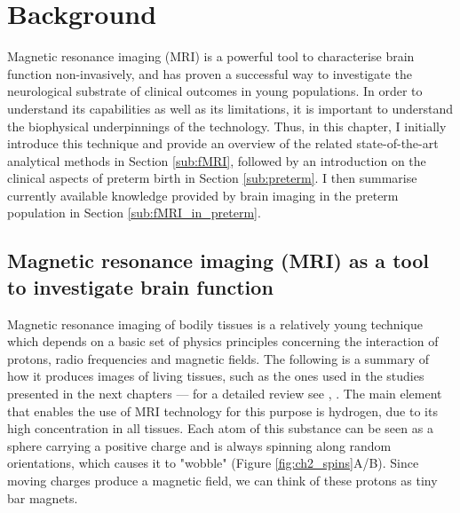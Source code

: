 \cleardoublepage
\chapter{Background} \label{chapter:ch2}




Magnetic resonance imaging (MRI) is a powerful tool to characterise brain function non-invasively, and has proven a successful way to investigate the neurological substrate of clinical outcomes in young populations. 
In order to understand its capabilities as well as its limitations, it is important to understand the biophysical underpinnings of the technology. 
Thus, in this chapter, I initially introduce this technique and provide an overview of the related state-of-the-art analytical methods in Section \ref{sub:fMRI}, followed by an introduction on the clinical aspects of preterm birth in Section \ref{sub:preterm}. 
I then summarise currently available knowledge provided by brain imaging in the preterm population in Section \ref{sub:fMRI_in_preterm}.

\section{Magnetic resonance imaging (MRI) as a tool to investigate brain function} \label{sec:MRI}
Magnetic resonance imaging \citep{Lauterbur1973} of bodily tissues is a relatively young technique \citep{Damadian1977} which depends on a basic set of physics principles concerning the interaction of protons, radio frequencies and magnetic fields. The following is a summary of how it produces images of living tissues, such as the ones used in the studies presented in the next chapters --- for a detailed review see \citeauthor{Grover2015}, \citeyear{Grover2015}. 
The main element that enables the use of MRI technology for this purpose is hydrogen, due to its high concentration in all tissues. 
Each atom of this substance can be seen as a sphere carrying a positive charge and is always spinning along random orientations, which causes it to "wobble" (Figure \ref{fig:ch2_spins}A/B). 
Since moving charges produce a magnetic field, we can think of these protons as tiny bar magnets. 

